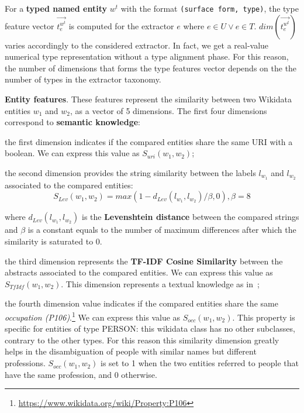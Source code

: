 \documentclass{llncs}
\begin{document}
For a \textbf{typed named entity} $w^t$ with the format \texttt{(surface form, type)}, the type feature vector $\vec{t^{w^{t}}_{e}}$ is computed for the extractor $e$ where $e \in U \lor e \in T$. $dim(\vec{t^{w^{t}}_{e}})$ varies accordingly to the considered extractor. In fact, we get a real-value numerical type representation without a type alignment phase. For this reason, the number of dimensions that forms the type features vector depends on the the number of types in the extractor taxonomy.

\textbf{Entity features}. These features represent the similarity between two Wikidata entities $w_1$ and $w_2$, as a vector of 5 dimensions. The first four dimensions correspond to \textbf{semantic knowledge}:
\begin{enumerate}
\begin{item}
the first dimension indicates if the compared entities share the same URI with a boolean. We can express this value as $S_{uri}(w_1,w_2)$; \end{item}
\begin{item}
the second dimension provides the string similarity between the labels $l_{w_1}$ and $l_{w_2}$ associated to the compared entities: 
$$S_{Lev}(w_1,w_2) = max(1-d_{Lev}(l_{w_1},l_{w_2})/\beta,0), \beta = 8$$

where $d_{Lev}(l_{w_1},l_{w_2})$ is the \textbf{Levenshtein distance} between the compared strings and $\beta$ is a constant equals to the number of maximum differences after which the similarity is saturated to 0.
\end{item}
\begin{item}
the third dimension represents the \textbf{TF-IDF Cosine Similarity} between the abstracts associated to the compared entities. We can express this value as $S_{TfIdf}(w_1,w_2)$. This dimension represents a textual knowledge as in~\cite{CollaborativeKnowledgeBaseEmbeddingforRecommenderSystems};
\end{item}
\begin{item}
the fourth dimension value indicates if the compared entities share the same \textit{occupation (P106)}.\footnote{\url{https://www.wikidata.org/wiki/Property:P106}} We can express this value as $S_{occ}(w_1,w_2)$. This property is specific for entities of type PERSON: this wikidata class has no other subclasses, contrary to the other types. For this reason this similarity dimension greatly helps in the disambiguation of people with similar names but different professions.  $S_{occ}(w_1,w_2)$ is set to 1 when the two entities referred to people that have the same profession, and 0 otherwise.
\end{item}
\end{enumerate}
\end{document}
